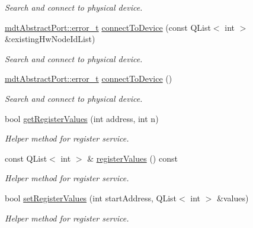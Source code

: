 \begin{DoxyCompactItemize}
\begin{DoxyCompactList}\small\item\em Search and connect to physical device. \end{DoxyCompactList}\item 
\hyperlink{classmdt_abstract_port_ad4121bb930c95887e77f8bafa065a85e}{mdt\-Abstract\-Port\-::error\-\_\-t} \hyperlink{classmdt_device_modbus_a08100215b37c0922ed177d1f99d07e97}{connect\-To\-Device} (const Q\-List$<$ int $>$ \&existing\-Hw\-Node\-Id\-List)
\begin{DoxyCompactList}\small\item\em Search and connect to physical device. \end{DoxyCompactList}\item 
\hyperlink{classmdt_abstract_port_ad4121bb930c95887e77f8bafa065a85e}{mdt\-Abstract\-Port\-::error\-\_\-t} \hyperlink{classmdt_device_modbus_abfcab17fbf05aab7843ae689316dd01f}{connect\-To\-Device} ()
\begin{DoxyCompactList}\small\item\em Search and connect to physical device. \end{DoxyCompactList}\item 
bool \hyperlink{classmdt_device_modbus_a89d41c6b33a3dd2a92a0956d8e6b3b14}{get\-Register\-Values} (int address, int n)
\begin{DoxyCompactList}\small\item\em Helper method for register service. \end{DoxyCompactList}\item 
const Q\-List$<$ int $>$ \& \hyperlink{classmdt_device_modbus_a83cb2a28111653fbcbbe748f7a1a2e3d}{register\-Values} () const 
\begin{DoxyCompactList}\small\item\em Helper method for register service. \end{DoxyCompactList}\item 
bool \hyperlink{classmdt_device_modbus_a4128420bde679c3666bdf8954a221a53}{set\-Register\-Values} (int start\-Address, Q\-List$<$ int $>$ \&values)
\begin{DoxyCompactList}\small\item\em Helper method for register service. \end{DoxyCompactList}\end{DoxyCompactItemize}
